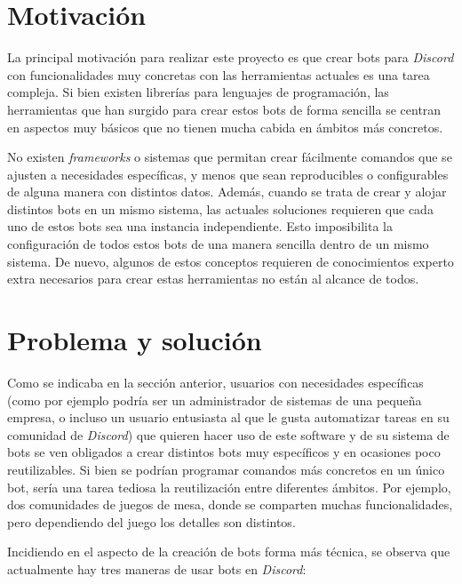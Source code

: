 \section{Motivación}

La principal motivación para realizar este proyecto es que crear bots para \textit{Discord} con funcionalidades muy concretas con las herramientas actuales es una tarea compleja. Si bien existen librerías para lenguajes de programación, las herramientas que han surgido para crear estos bots de forma sencilla se centran en aspectos muy básicos que no tienen mucha cabida en ámbitos más concretos.

No existen \textit{frameworks} o sistemas que permitan crear fácilmente comandos que se ajusten a necesidades específicas, y menos que sean reproducibles o configurables de alguna manera con distintos datos. Además, cuando se trata de crear y alojar distintos bots en un mismo sistema, las actuales soluciones requieren que cada uno de estos bots sea una instancia independiente. Esto imposibilita la configuración de todos estos bots de una manera sencilla dentro de un mismo sistema. De nuevo, algunos de estos conceptos requieren de conocimientos experto extra necesarios para crear estas herramientas no están al alcance de todos.

\section{Problema y solución}

Como se indicaba en la sección anterior, usuarios con necesidades específicas (como por ejemplo podría ser un administrador de sistemas de una pequeña empresa, o incluso un usuario entusiasta al que le gusta automatizar tareas en su comunidad de \textit{Discord}) que quieren hacer uso de este software y de su sistema de bots se ven obligados a crear distintos bots muy específicos y en ocasiones poco reutilizables. Si bien se podrían programar comandos más concretos en un único bot, sería una tarea tediosa la reutilización entre diferentes ámbitos. Por ejemplo, dos comunidades de juegos de mesa, donde se comparten muchas funcionalidades, pero dependiendo del juego los detalles son distintos.

Incidiendo en el aspecto de la creación de bots forma más técnica, se observa que actualmente hay tres maneras de usar bots en \textit{Discord}:

